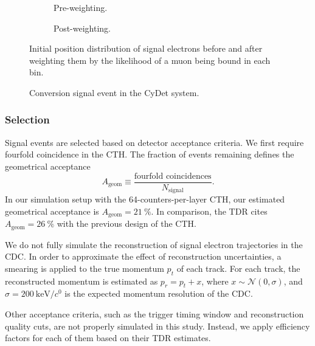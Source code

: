 
\begin{figure}
    \centering
    \begin{subfigure}{0.46\textwidth}
        \centering
        \caption{Pre-weighting.}
    \end{subfigure}
    \hfill
    \begin{subfigure}{0.46\textwidth}
        \centering
        \caption{Post-weighting.}
    \end{subfigure}
    \caption{ Initial position distribution of signal electrons before and after
        weighting them by the likelihood of a muon being bound in each bin. }
    \label{fig:stopping_position_reweighting}
\end{figure}

\begin{figure}
    \centering
    
    \caption{Conversion signal event in the CyDet system.}
    \label{fig:signal_in_cydet}
\end{figure}

\subsubsection{Selection}
Signal events are selected based on detector acceptance criteria. We first require
fourfold coincidence in the CTH. The fraction of events remaining
defines the geometrical acceptance 
$$
A_\mathrm{geom} \equiv  \frac{\text{fourfold coincidences}}{N_\mathrm{signal}}.
$$
In our simulation setup with the 64-counters-per-layer CTH, our estimated
geometrical acceptance is $A_\mathrm{geom} = \SI{21}{\percent}$. In comparison,
the TDR cites $A_\mathrm{geom} = \SI{26}{\percent}$ with the previous design of
the CTH.

We do not fully simulate the reconstruction of signal electron trajectories in
the CDC. In order to approximate the effect of reconstruction uncertainties, a
smearing is applied to the true momentum $p_t$ of each track. For each track,
the reconstructed momentum is estimated as $p_r = p_t + x$, where $x \sim
\mathcal{N}(0, \sigma)$, and $\sigma = \SI{200}{\keV/\clight}$ is the expected
momentum resolution of the CDC.

Other acceptance criteria, such as the trigger timing window and reconstruction
quality cuts, are not properly simulated in this study. Instead, we apply
efficiency factors for each of them based on their TDR estimates.


